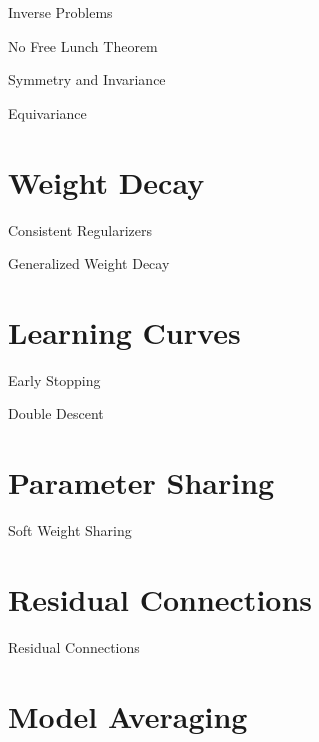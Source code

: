 \documentclass{beamer}
\begin{document}
\begin{frame}{Inverse Problems}
\end{frame}

\begin{frame}{No Free Lunch Theorem}
\end{frame}

\begin{frame}{Symmetry and Invariance}
\end{frame}

\begin{frame}{Equivariance}
\end{frame}

\section{Weight Decay}

\begin{frame}{Consistent Regularizers}
\end{frame}

\begin{frame}{Generalized Weight Decay}
\end{frame}

\section{Learning Curves}

\begin{frame}{Early Stopping}
\end{frame}

\begin{frame}{Double Descent}
\end{frame}

\section{Parameter Sharing}

\begin{frame}{Soft Weight Sharing}
\end{frame}

\section{Residual Connections}

\begin{frame}{Residual Connections}
\end{frame}

\section{Model Averaging}
\end{document}

